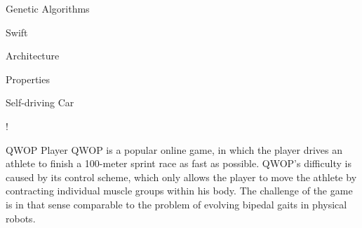 \documentclass[a0paper,portrait]{baposter}
\begin{document}
\begin{poster}
\begin{posterbox}[name=intro-ga,column=0,below=objectives]{Genetic Algorithms}
\lipsum[2]
\end{posterbox}

\begin{posterbox}[name=intro-swift,column=0,below=intro-ga]{Swift}
\lipsum[3]
\end{posterbox}

\begin{posterbox}[name=arch,column=1]{Architecture}
\lipsum[4]
\end{posterbox}

\begin{posterbox}[name=props,column=1,below=arch]{Properties}
\lipsum[5]
\end{posterbox}

\begin{posterbox}[name=car,column=1,below=props]{Self-driving Car}
\lipsum[6]
\begin{center}
\resizebox {\columnwidth} {!} {
}
\end{center}
\end{posterbox}

\begin{posterbox}[name=qwop,column=2]{QWOP Player}
QWOP is a popular online game, in which the player drives an athlete to finish a 100-meter sprint race as fast as possible. QWOP's difficulty is caused by its control scheme, which only allows the player to move the athlete by contracting individual muscle groups within his body. The challenge of the game is in that sense comparable to the problem of evolving bipedal gaits in physical robots.

\vspace{0.5em}


\end{posterbox}
\end{poster}
\end{document}
